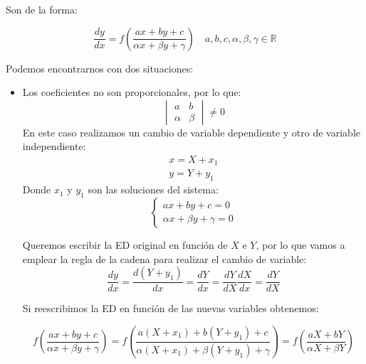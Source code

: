 \documentclass[a4paper,12pt,titlepage]{article}
\begin{document}
Son de la forma:

\begin{equation*}
    \frac{dy}{dx} = f\left (\frac{ax + by +c}{\alpha x + \beta y + \gamma}\right ) \quad a,b,c,\alpha, \beta, \gamma \in \mathbb{R}
\end{equation*}

Podemos encontrarnos con dos situaciones:

\begin{itemize}
    \item Los coeficientes no son proporcionales, por lo que: 
    \begin{equation*}
        \begin{vmatrix}
            a & b \\
            \alpha & \beta
        \end{vmatrix} \neq 0
    \end{equation*}
    En este caso realizamos un cambio de variable dependiente y otro de variable independiente:
    \begin{equation*}
        \begin{gathered}
            x = X + x_1 \\
            y = Y + y_1
        \end{gathered}
    \end{equation*}
    Donde $x_1$ y $y_1$ son las soluciones del sistema:
    \begin{equation*}
        \left\{\begin{array}{l}
            ax + by + c =0 \\
            \alpha x + \beta y + \gamma =0
        \end{array}\right.
    \end{equation*}

    Queremos escribir la ED original en función de $X$ e $Y$, por lo que vamos a emplear la regla de la cadena para realizar el cambio de variable:
    \begin{equation*}
        \frac{dy}{dx} = \frac{d(Y+y_1)}{dx} = \frac{dY}{dx} = \frac{dY}{dX} \frac{dX}{dx} = \frac{dY}{dX}
    \end{equation*}


    Si reescribimos la ED en función de las nuevas variables obtenemos:

    \begin{equation*}
        f\left (\frac{ax + by +c}{\alpha x + \beta y + \gamma}\right )  = f \left (\frac{a(X+x_1)+b(Y+y_1)+c}{\alpha(X+x_1)+\beta(Y+y_1)+\gamma}\right ) = f\left (\frac{aX+bY}{\alpha X + \beta Y}\right )
    \end{equation*}


\end{itemize}
\end{document}
